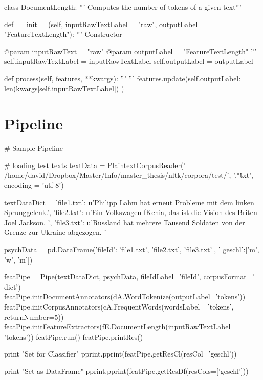 \begin{DoxyCode}
 class DocumentLength:
     ''' Computes the number of tokens of a given text'''
 
     def __init__(self, inputRawTextLabel = "raw", 
                  outputLabel = "FeatureTextLength"):
         ''' Constructor
 
         @param inputRawText = "raw"
         @param outputLabel = "FeatureTextLength"
         '''
         self.inputRawTextLabel = inputRawTextLabel
         self.outputLabel = outputLabel
 
     def process(self, features, **kwargs):
         '''
         '''
         features.update({self.outputLabel: len(kwargs[self.inputRawTextLabel])
      })
\end{DoxyCode}
\hypertarget{index_Example}{}\section{\-Pipeline}\label{index_Example}

\begin{DoxyCode}
 # Sample Pipeline
 
 # loading test texts
 textData = PlaintextCorpusReader('
      /home/david/Dropbox/Master/Info/master_thesis/nltk/corpora/test/', 
                                 '.*\.txt',  encoding = 'utf-8')
 
 textDataDict = {
 'file1.txt': u'Philipp Lahm hat erneut Probleme mit dem linken Sprunggelenk.',
 'file2.txt': u'Ein Volkswagen f\xfcr Kenia, das ist die Vision des Briten Joel
       Jackson. ',
 'file3.txt': u'Russland hat mehrere Tausend Soldaten von der Grenze zur
       Ukraine abgezogen. \n'}
 
 psychData = pd.DataFrame({'fileId':['file1.txt', 'file2.txt', 'file3.txt'], '
      geschl':['m', 'w', 'm']})
 
 featPipe = Pipe(textDataDict, psychData, fileIdLabel='fileId', corpusFormat='
      dict')
 featPipe.initDocumentAnnotators(dA.WordTokenize(outputLabel='tokens'))
 featPipe.initCorpusAnnotators(cA.FrequentWords(wordsLabel= 'tokens', 
      returnNumber=5))
 featPipe.initFeatureExtractors(fE.DocumentLength(inputRawTextLabel= 'tokens'))
 featPipe.run()
 featPipe.printRes()
 
 print "\nResult Set for Classifier"
 pprint.pprint(featPipe.getResCl(resCol='geschl'))
 
 print "\nResult Set as DataFrame"
 pprint.pprint(featPipe.getResDf(resCols=['geschl']))
\end{DoxyCode}



